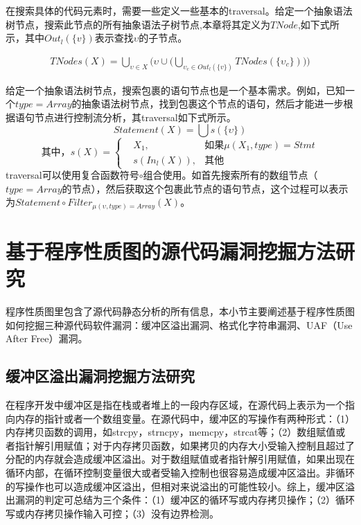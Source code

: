 {在搜索具体的代码元素时，需要一些定义一些基本的traversal。给定一个抽象语法树节点，搜索此节点的所有抽象语法子树节点,本章将其定义为$TNode$,如下式所示，其中$Out_{l} (\{v \})$表示查找$\upsilon$的子节点。

\begin{align*}
TNodes(X) = \bigcup_{\upsilon \in X} \big(\upsilon \cup \big( \bigcup_{\upsilon_{c} \in Out_{l} (\{v \}) } TNodes(\{\upsilon_{c} \}) \big) \big)
\end{align*}

给定一个抽象语法树节点，搜索包裹的语句节点也是一个基本需求。例如，已知一个$type=Array$的抽象语法树节点，找到包裹这个节点的语句，然后才能进一步根据语句节点进行控制流分析，其traversal如下式所示。
$$
Statement(X) = \bigcup s(\{ \upsilon \})
$$
$$
\text{其中，}s(X)=\left\{
\begin{aligned}
& X_{1}, & \text{如果} \mu(X_{1}, type)=Stmt \\
& s(In_{l} (X)), & \text{其他}
\end{aligned}
\right.
$$
traversal可以使用复合函数符号$\circ$组合使用。如首先搜索所有的数组节点{（$type=Array$的节点）}，然后获取这个包裹此节点的语句节点，这个过程可以表示为$Statement \circ Filter_{\mu (\upsilon, type) = Array} (X)$。

\section{基于程序性质图的源代码漏洞挖掘方法研究}\label{基于程序性质图的源代码漏洞粗定位方法研究}
程序性质图里包含了源代码静态分析的所有信息，本小节主要阐述基于程序性质图如何挖掘三种源代码软件漏洞：缓冲区溢出漏洞、格式化字符串漏洞、UAF（Use After Free）漏洞。

\subsection{缓冲区溢出漏洞挖掘方法研究}
\label{缓冲区溢出漏洞检测}


在程序开发中缓冲区是指在栈或者堆上的一段内存区域，在源代码上表示为一个指向内存的指针或者一个数组变量。在源代码中，缓冲区的写操作有两种形式：（1）内存拷贝函数的调用，如strcpy，strncpy，memcpy，strcat等；（2）数组赋值或者指针解引用赋值；对于内存拷贝函数，如果拷贝的内存大小受输入控制且超过了分配的内存就会造成缓冲区溢出。对于数组赋值或者指针解引用赋值，如果出现在循环内部，在循环控制变量很大或者受输入控制也很容易造成缓冲区溢出。非循环的写操作也可以造成缓冲区溢出，但相对来说溢出的可能性较小。综上，缓冲区溢出漏洞的判定可总结为三个条件：（1）缓冲区的循环写或内存拷贝操作；（2）循环写或内存拷贝操作输入可控；（3）没有边界检测。

}
